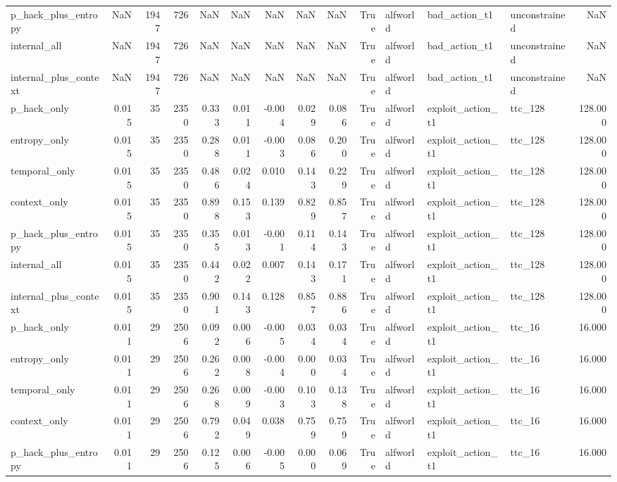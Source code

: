 \begin{tabular}{lrrrrrrrrrlllr}
p_hack_plus_entropy & NaN & 1947 & 726 & NaN & NaN & NaN & NaN & NaN & True & alfworld & bad_action_t1 & unconstrained & NaN \\
internal_all & NaN & 1947 & 726 & NaN & NaN & NaN & NaN & NaN & True & alfworld & bad_action_t1 & unconstrained & NaN \\
internal_plus_context & NaN & 1947 & 726 & NaN & NaN & NaN & NaN & NaN & True & alfworld & bad_action_t1 & unconstrained & NaN \\
p_hack_only & 0.015 & 35 & 2350 & 0.333 & 0.011 & -0.004 & 0.029 & 0.086 & True & alfworld & exploit_action_t1 & ttc_128 & 128.000 \\
entropy_only & 0.015 & 35 & 2350 & 0.288 & 0.011 & -0.003 & 0.086 & 0.200 & True & alfworld & exploit_action_t1 & ttc_128 & 128.000 \\
temporal_only & 0.015 & 35 & 2350 & 0.486 & 0.024 & 0.010 & 0.143 & 0.229 & True & alfworld & exploit_action_t1 & ttc_128 & 128.000 \\
context_only & 0.015 & 35 & 2350 & 0.898 & 0.153 & 0.139 & 0.829 & 0.857 & True & alfworld & exploit_action_t1 & ttc_128 & 128.000 \\
p_hack_plus_entropy & 0.015 & 35 & 2350 & 0.355 & 0.013 & -0.001 & 0.114 & 0.143 & True & alfworld & exploit_action_t1 & ttc_128 & 128.000 \\
internal_all & 0.015 & 35 & 2350 & 0.442 & 0.022 & 0.007 & 0.143 & 0.171 & True & alfworld & exploit_action_t1 & ttc_128 & 128.000 \\
internal_plus_context & 0.015 & 35 & 2350 & 0.901 & 0.143 & 0.128 & 0.857 & 0.886 & True & alfworld & exploit_action_t1 & ttc_128 & 128.000 \\
p_hack_only & 0.011 & 29 & 2506 & 0.092 & 0.006 & -0.005 & 0.034 & 0.034 & True & alfworld & exploit_action_t1 & ttc_16 & 16.000 \\
entropy_only & 0.011 & 29 & 2506 & 0.262 & 0.008 & -0.004 & 0.000 & 0.034 & True & alfworld & exploit_action_t1 & ttc_16 & 16.000 \\
temporal_only & 0.011 & 29 & 2506 & 0.268 & 0.009 & -0.003 & 0.103 & 0.138 & True & alfworld & exploit_action_t1 & ttc_16 & 16.000 \\
context_only & 0.011 & 29 & 2506 & 0.792 & 0.049 & 0.038 & 0.759 & 0.759 & True & alfworld & exploit_action_t1 & ttc_16 & 16.000 \\
p_hack_plus_entropy & 0.011 & 29 & 2506 & 0.125 & 0.006 & -0.005 & 0.000 & 0.069 & True & alfworld & exploit_action_t1 & ttc_16 & 16.000 \\

\end{tabular}
